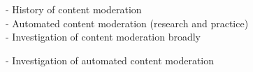 - History of content moderation \\

\noindent - Automated content moderation (research and practice) \\
 
\noindent - Investigation of content moderation broadly \\
\cite{ozanne2022shall}

\noindent - Investigation of automated content moderation \\